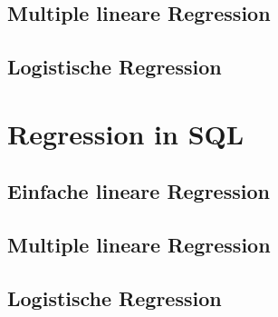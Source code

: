 \subsection{Multiple lineare Regression}

\subsection{Logistische Regression}

\section{Regression in SQL}

\subsection{Einfache lineare Regression}

\subsection{Multiple lineare Regression}

\subsection{Logistische Regression}
